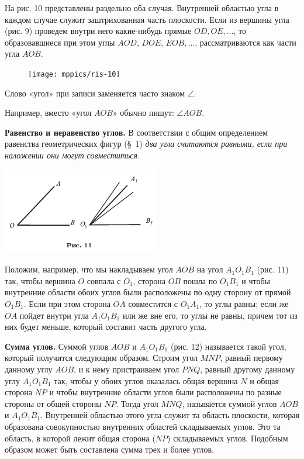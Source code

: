 \documentclass[oneside]{book}
\begin{document}
На рис. 10 представлены раздельно оба случая.
Внутренней областью угла в каждом случае служит заштрихованная часть плоскости.
Если из вершины угла (рис. 9) проведем внутри него какие-нибудь прямые $OD, OE,\dots$, то образовавшиеся при этом углы $AOD$, $DOE$, $EOB,\dots$, рассматриваются как части угла $AOB$.

\begin{figure}[h!]
\begin{center}
\texttt{[image: mppics/ris-10]}
\caption{}
\end{center}
\end{figure}

Слово «угол» при записи заменяется часто знаком $\angle$.

Например, вместо «угол $AOB$» обычно пишут:
$\angle AOB$.

\textbf{Равенство и неравенство углов.}
В соответствии с общим определением равенства геометрических фигур (§~1) \emph{два угла считаются равными, если при наложении они могут совместиться.}

\includegraphics{pics/ris-11}

Положим, например, что мы накладываем угол $AOB$ на угол $A_1O_1B_1$ (рис. 11) так, чтобы вершина $O$ совпала с $O_1$, сторона $OB$ пошла по $O_1B_1$ и чтобы внутренние области обоих углов были расположены по одну сторону от прямой $O_1B_1$.
Если при этом сторона $OA$ совместится с $O_1A_1$, то углы равны;
если же $OA$ пойдет внутри угла $A_1O_1B_1$ или же вне его, то углы не равны, причем тот из них будет меньше, который составит часть другого угла.

\textbf{Сумма углов.}
Суммой углов $AOB$ и $A_1O_1B_1$ (рис. 12) называется такой угол, который получится следующим образом.
Строим угол $MNP$, равный первому данному углу $AOB$, и к нему пристраиваем угол $PNQ$, равный другому данному углу $A_1O_1B_1$ так, чтобы у обоих углов оказалась общая вершина $N$ и общая сторона $NP$ и чтобы внутренние области углов были расположены по разные стороны от общей стороны $NP$.
Тогда угол $MNQ$, называется суммой углов $AOB$ и $A_1O_1B_1$.
Внутренней областью этого угла служит та область плоскости, которая образована совокупностью внутренних областей складываемых углов.
Это та область, в которой лежит общая сторона ($NP$) складываемых углов.
Подобным образом может быть составлена сумма трех и более углов.
\end{document}
